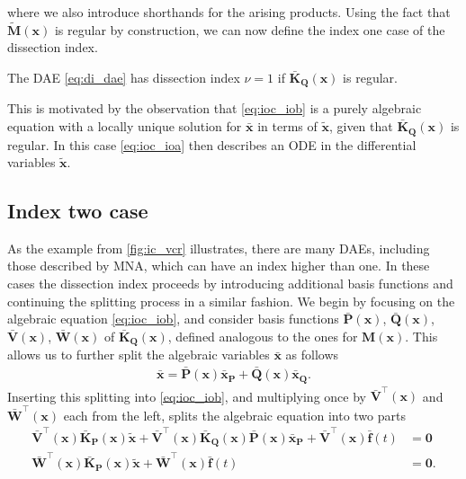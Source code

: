 \documentclass[AMA,STIX1COL]{WileyNJD-v2}
\newcommand{\mb}[1]{\mathbf{#1}}
\newcommand{\mbt}[1]{\tilde{\mathbf{#1}}}
\newcommand{\mbb}[1]{\bar{\mathbf{#1}}}
\newcommand{\T}{{\!\top}}
\begin{document}
where we also introduce shorthands for the arising products. Using the fact that $\mbt{M}(\mb{x})$ is regular by construction\cite{jansen2014}, we can now define the index one case of the dissection index.
\begin{definition}
    \label{def:ioc_io}
    The DAE \eqref{eq:di_dae} has dissection index $\nu = 1$ if $\mbb{K}_\mb{Q}(\mb{x})$ is regular.
\end{definition}
This is motivated by the observation that \eqref{eq:ioc_iob} is a purely algebraic equation with a locally unique solution for $\mbb{x}$ in terms of $\mbt{x}$, given that $\mbb{K}_\mb{Q}(\mb{x})$ is regular. In this case \eqref{eq:ioc_ioa} then describes an ODE in the differential variables $\mbt{x}$.

\subsection{Index two case}
\label{subsec:itc}
As the example from \autoref{fig:ic_vcr} illustrates, there are many DAEs, including those described by MNA, which can have an index higher than one. In these cases the dissection index proceeds by introducing additional basis functions and continuing the splitting process in a similar fashion. We begin by focusing on the algebraic equation \eqref{eq:ioc_iob}, and consider basis functions $\mbb{P}(\mb{x})$, $\mbb{Q}(\mb{x})$, $\mbb{V}(\mb{x})$, $\mbb{W}(\mb{x})$ of $\mbb{K}_\mb{Q}(\mb{x})$, defined analogous to the ones for $\mb{M}(\mb{x})$. This allows us to further split the algebraic variables $\mbb{x}$ as follows
\begin{align}
    \mbb{x} = \mbb{P}(\mb{x}) \mbb{x}_\mb{P} + \mbb{Q}(\mb{x}) \mbb{x}_\mb{Q}. \label{eq:itc_xb}
\end{align}
Inserting this splitting into \eqref{eq:ioc_iob}, and multiplying once by $\mbb{V}^\T (\mb{x})$ and $\mbb{W}^\T (\mb{x})$ each from the left, splits the algebraic equation into two parts
\begin{subequations}
    \label{eq:itc_iti}
    \begin{align}
        \mbb{V}^\T (\mb{x}) \mbb{K}_\mb{P}(\mb{x}) \mbt{x} + \mbb{V}^\T (\mb{x}) \mbb{K}_\mb{Q}(\mb{x}) \mbb{P}(\mb{x}) \mbb{x}_\mb{P} + \mbb{V}^\T (\mb{x}) \mbb{f}(t) &= \mb{0} \label{eq:itc_itia}\\
        \mbb{W}^\T (\mb{x}) \mbb{K}_\mb{P}(\mb{x}) \mbt{x} + \mbb{W}^\T (\mb{x}) \mbb{f}(t) &= \mb{0}. \label{eq:itc_itib}
    \end{align}
\end{subequations}
\end{document}
